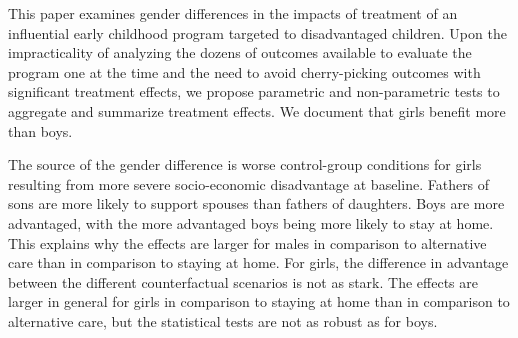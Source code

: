 This paper examines gender differences in the impacts of treatment of an influential early childhood program targeted to disadvantaged children. Upon the impracticality of analyzing the dozens of outcomes available to evaluate the program one at the time and the need to avoid cherry-picking outcomes with significant treatment effects, we propose parametric and non-parametric tests to aggregate and summarize treatment effects. We document that girls benefit more than boys. 

The source of the gender difference is worse control-group conditions for girls resulting from more severe socio-economic disadvantage at baseline. Fathers of sons are more likely to support spouses than fathers of daughters. Boys are more advantaged, with the more advantaged boys being more likely to stay at home. This explains why the effects are larger for males in comparison to alternative care than in comparison to staying at home. For girls, the difference in advantage between the different counterfactual scenarios is not as stark. The effects are larger in general for girls in comparison to staying at home than in comparison to alternative care, but the statistical tests are not as robust as for boys.